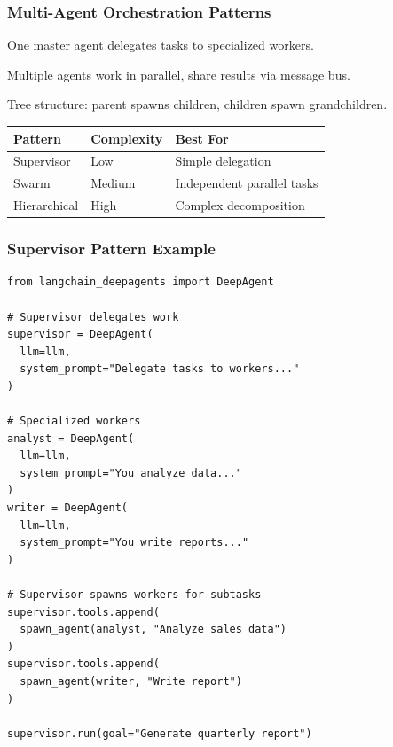 \documentclass[aspectratio=169,11pt]{beamer}
\begin{document}
\begin{frame}[fragile]
\frametitle{Multi-Agent Orchestration Patterns}

\begin{conceptbox}
One master agent delegates tasks to specialized workers.
\end{conceptbox}

\begin{conceptbox}
Multiple agents work in parallel, share results via message bus.
\end{conceptbox}

\begin{conceptbox}
Tree structure: parent spawns children, children spawn grandchildren.
\end{conceptbox}

\begin{center}
\small
\begin{tabular}{lll}
\toprule
\textbf{Pattern} & \textbf{Complexity} & \textbf{Best For} \\
\midrule
Supervisor & Low & Simple delegation \\
Swarm & Medium & Independent parallel tasks \\
Hierarchical & High & Complex decomposition \\
\bottomrule
\end{tabular}
\end{center}

\end{frame}

\begin{frame}[fragile]
\frametitle{Supervisor Pattern Example}

\begin{lstlisting}
from langchain_deepagents import DeepAgent

# Supervisor delegates work
supervisor = DeepAgent(
  llm=llm,
  system_prompt="Delegate tasks to workers..."
)

# Specialized workers
analyst = DeepAgent(
  llm=llm,
  system_prompt="You analyze data..."
)
writer = DeepAgent(
  llm=llm,
  system_prompt="You write reports..."
)

# Supervisor spawns workers for subtasks
supervisor.tools.append(
  spawn_agent(analyst, "Analyze sales data")
)
supervisor.tools.append(
  spawn_agent(writer, "Write report")
)

supervisor.run(goal="Generate quarterly report")
\end{lstlisting}

\end{frame}
\end{document}
